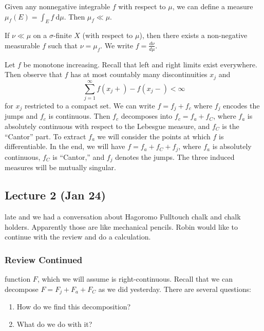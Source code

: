 \documentclass[10pt, twoside]{article}
\renewcommand{\d}{\ \mathrm{d}}
\begin{document}
    \begin{exm} Given any nonnegative integrable $f$ with respect to $\mu$, we
    can define a measure $\mu_f(E) = \int_E f \d \mu$. Then $\mu_f \ll \mu$.
\end{exm}

    \begin{thm} If $\nu \ll \mu$ on a $\sigma$-finite $X$ (with
    respect to $\mu$), then there exists a non-negative measurable $f$ such
that $\nu = \mu_f$. We write $f = \frac{d\nu}{d\mu}$.  \end{thm}

    \begin{exm} Let $f$ be monotone increasing. Recall that left and right
        limits exist everywhere. Then observe that $f$ has at most countably
        many discontinuities $x_j$ and \[ \sum_{j=1}^{\infty} f(x_j+) - f(x_j-)
        < \infty \] for $x_j$ restricted to a compact set. We can write $f =
        f_j + f_c$ where $f_j$ encodes the jumps and $f_c$ is continuous. Then
        $f_c$ decomposes into $f_c = f_a + f_C$, where $f_a$ is absolutely
        continuous with respect to the Lebesgue measure, and $f_C$ is the
        ``Cantor'' part. To extract $f_a$ we will consider the points at which
        $f$ is differentiable. In the end, we will have $f = f_a + f_C + f_j$,
        where $f_a$ is absolutely continuous, $f_C$ is ``Cantor,'' and $f_j$
        denotes the jumps. The three induced measures will be mutually
        singular.  \end{exm}

    \subsection{Lecture 2 (Jan 24)}%
    late and we had a conversation about Hagoromo Fulltouch chalk and chalk
    holders. Apparently those are like mechanical pencils. Robin would like to
    continue with the review and do a calculation.

   \subsubsection{Review Continued}%
   function $F$, which we will assume is right-continuous. Recall that we can
   decompose $F = F_j + F_a + F_C$ as we did yesterday.  There are several
   questions: \begin{enumerate} \item How do we find this decomposition?  \item
   What do we do with it?  \end{enumerate}
\end{document}
